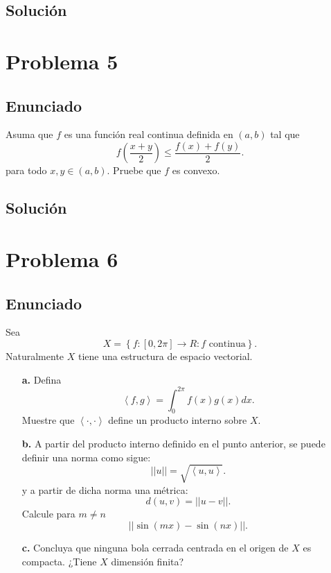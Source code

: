 \documentclass{report}
\begin{document}
\section{Solución}

\chapter{Problema 5}
\section{Enunciado}

Asuma que $f$ es una función real continua definida en $\left( a, b \right) $ tal que \[
f\left( \frac{x + y}{2} \right) \le \frac{f(x) + f(y)}{2}
.\] para todo $x, y \in \left( a,b \right) $. Pruebe que $f$ es convexo.
\section{Solución}


\chapter{Problema 6}
\section{Enunciado}

Sea \[
X = \left\{ f:\left[ 0, 2\pi \right] \to R: \text{$f$ continua} \right\} 
.\] Naturalmente $X$ tiene una estructura de espacio vectorial.
\begin{enumerate}
  \item[\textbf{a.}] Defina \[
      \left<f, g \right> = \int_0^{2\pi}f\left( x \right) g\left( x \right) dx	
    .\] Muestre que $\left< \cdot, \cdot\right>$ define un producto interno sobre $X$.
  \item[\textbf{b.}] A partir del producto interno definido en el punto anterior, se puede definir una norma como sigue: \[
      \left| \left| u \right|  \right|  = \sqrt{\left<u, u \right>} 
      .\] y a partir de dicha norma una métrica: \[
      d(u, v) =  \left| \left| u - v \right|  \right| 
      .\] Calcule para $m \neq n$ \[
      \left| \left| \sin\left( mx \right) - \sin\left( nx \right)  \right|  \right| 
    .\] 
  \item[\textbf{c.}] Concluya que ninguna bola cerrada centrada en el origen de $X$ es compacta. ¿Tiene $X$ dimensión finita?
\end{enumerate}
\end{document}

